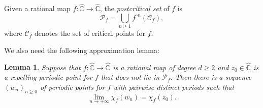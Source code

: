 \documentclass[JEP,XML,SOM,Unicode,published]{cedram}
\theoremstyle{plain}
\newtheorem{lemma}[theorem]{Lemma}
\theoremstyle{definition}
\theoremstyle{remark}
\begin{document}
Given a rational map $f \colon \widehat{\mathbb{C}} \to \widehat{\mathbb{C}}$, the \emph{postcritical set} of $f$ is
\[
\mathcal{P}_{f} = \bigcup_{n \geq 1} f^{\circ n}(\mathcal{C}_{f}),
\]
where $\mathcal{C}_{f}$ denotes the set of critical points for $f$.

We also need the following approximation lemma:

\begin{lemma}
\label{lemma:homoclinic}
Suppose that $f \colon \widehat{\mathbb{C}} \to \widehat{\mathbb{C}}$ is a rational map of degree $d \geq 2$ and $z_{0} \in \widehat{\mathbb{C}}$ is a repelling periodic point for $f$ that does not lie in $\mathcal{P}_{f}$. Then there is a sequence $(w_{n})_{n \geq 0}$ of periodic points for $f$ with pairwise distinct periods such that
\[
\lim_{n \to +\infty} \chi_{f}(w_{n}) = \chi_{f}(z_{0}).
\]
\end{lemma}
\end{document}
